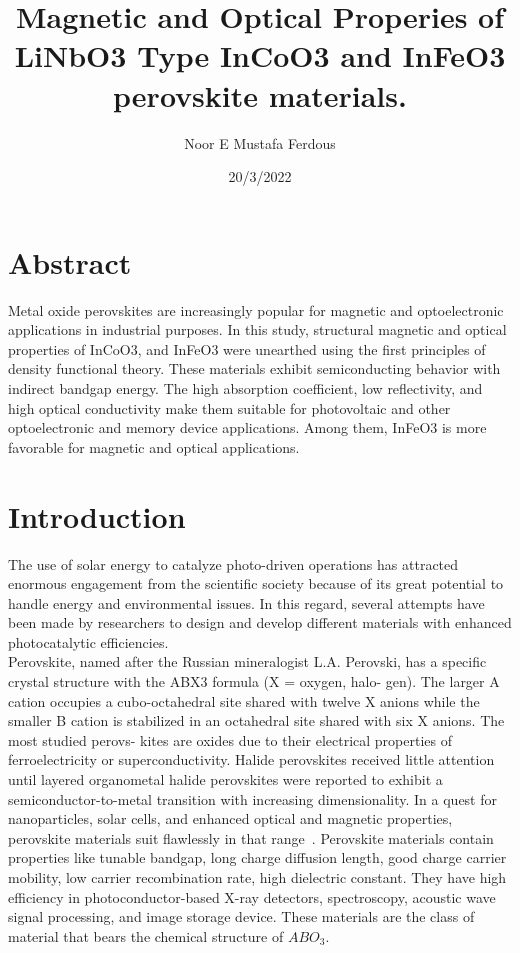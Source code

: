 \documentclass[12pt, letterpaper]{article}
\title{Magnetic and Optical Properies of  LiNbO3 Type InCoO3 and InFeO3 perovskite materials.}
\author{Noor E Mustafa Ferdous}
\date{20/3/2022}
\newcommand*{\1}{\hspace{1pt}}
\begin{document}
    \maketitle
    \newpage
    \tableofcontents
    \newpage
    \listoffigures
    
    \newpage
    \section{Abstract}
    Metal oxide perovskites are increasingly popular for magnetic and optoelectronic applications in industrial purposes. In this study, structural magnetic and 
    optical properties of InCoO3, and InFeO3 were unearthed using the first principles of density functional theory. These materials exhibit semiconducting behavior 
    with indirect bandgap energy. The high absorption coefficient, low reflectivity, and high optical conductivity make them suitable for photovoltaic and other 
    optoelectronic and memory device applications. Among them, InFeO3 is more favorable for magnetic and optical applications.
     
    \section{Introduction}
    The use of solar energy to catalyze photo-driven operations has 
    attracted enormous engagement from the scientific society because of 
    its great potential to handle energy and environmental issues. In this 
    regard, several attempts have been made by researchers to design and 
    develop different materials with enhanced photocatalytic efficiencies.\cite{r1}\\
    Perovskite, named after the Russian mineralogist L.A. Perovski, has a
    specific crystal structure with the ABX3 formula (X = oxygen, halo-
    gen). The larger A cation occupies a cubo-octahedral site shared with
    twelve X anions while the smaller B cation is stabilized in an
    octahedral site shared with six X anions. The most studied perovs-
    kites are oxides due to their electrical properties of ferroelectricity or
    superconductivity. Halide perovskites received little attention until
    layered organometal halide perovskites were reported to exhibit a
    semiconductor-to-metal transition with increasing dimensionality.
    In a quest for nanoparticles, solar cells, and enhanced optical and magnetic properties, perovskite materials suit flawlessly in that range~\cite{r1}. Perovskite materials 
    contain properties like tunable bandgap, long charge diffusion length, good charge carrier mobility, low carrier recombination rate, high dielectric constant. 
    They have high efficiency in photoconductor-based X-ray detectors, spectroscopy, acoustic wave signal processing, and image storage device. These materials are 
    the class of material that bears the chemical structure of $ABO_{3}$\cite{r2,r13,r14}.
    
\end{document}
